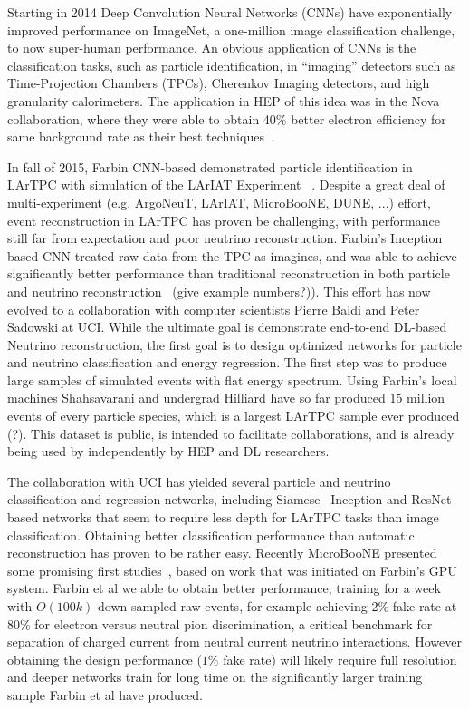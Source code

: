 
Starting in 2014 Deep Convolution Neural Networks (CNNs) have
exponentially improved performance on ImageNet, a one-million image
classification challenge\cite{}, to now super-human
performance\cite{}.  An obvious application of CNNs is the
classification tasks, such as particle identification, in ``imaging''
detectors such as Time-Projection Chambers (TPCs), Cherenkov Imaging
detectors, and high granularity calorimeters. The application in HEP
of this idea was in the Nova collaboration, where they were able to
obtain 40\% better electron efficiency for same background rate as
their best techniques~\cite{}. 


In fall of 2015, Farbin CNN-based demonstrated particle identification
in LArTPC with simulation of the LArIAT Experiment ~\cite{}. Despite a
great deal of multi-experiment (e.g. ArgoNeuT, LArIAT, MicroBooNE,
DUNE, ...) effort, event reconstruction in LArTPC has proven be
challenging, with performance still far from expectation and poor
neutrino reconstruction. Farbin's Inception~\cite{} based CNN treated
raw data from the TPC as imagines, and was able to achieve
significantly better performance than traditional reconstruction in
both particle and neutrino reconstruction~\cite{} (give example
numbers?)). This effort has now evolved to a collaboration with
computer scientists Pierre Baldi and Peter Sadowski at UCI. While the
ultimate goal is demonstrate end-to-end DL-based Neutrino
reconstruction, the first goal is to design optimized networks for
particle and neutrino classification and energy regression. The first
step was to produce large samples of simulated events with flat energy
spectrum. Using Farbin's local machines Shahsavarani and undergrad
Hilliard have so far produced 15 million events of every particle
species, which is a largest LArTPC sample ever produced (?). This
dataset is public, is intended to facilitate collaborations, and is
already being used by independently by HEP and DL researchers.

The collaboration with UCI has yielded several particle and neutrino
classification and regression networks, including Siamese~\cite{}
Inception and ResNet~\cite{} based networks that seem to require less
depth for LArTPC tasks than image classification.  Obtaining better
classification performance than automatic reconstruction has proven to
be rather easy. Recently MicroBooNE presented some promising first
studies~\cite{}, based on work that was initiated on Farbin's GPU
system. Farbin et al we able to obtain better performance, training
for a week with $O(100k)$ down-sampled raw events, for example
achieving 2\% fake rate at 80\% for electron versus neutral pion
discrimination, a critical benchmark for separation of charged
current from neutral current neutrino interactions.  However
obtaining the design performance ($1\%$ fake rate) will likely require
full resolution and deeper networks train for long time on the
significantly larger training sample Farbin et al have produced.

